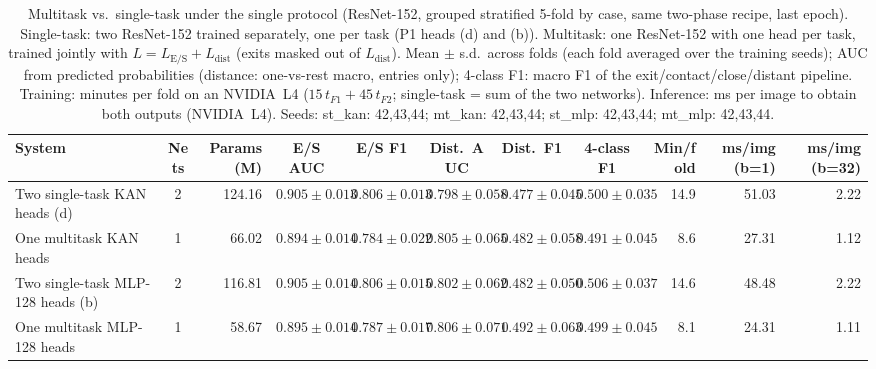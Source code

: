 \begin{table}[t]
\centering
\caption{Multitask vs.\ single-task under the single protocol (ResNet-152, grouped stratified 5-fold by case, same two-phase recipe, last epoch). Single-task: two ResNet-152 trained separately, one per task (P1 heads (d) and (b)). Multitask: one ResNet-152 with one head per task, trained jointly with $L = L_{\mathrm{E/S}} + L_{\mathrm{dist}}$ (exits masked out of $L_{\mathrm{dist}}$). Mean $\pm$ s.d.\ across folds (each fold averaged over the training seeds); AUC from predicted probabilities (distance: one-vs-rest macro, entries only); 4-class F1: macro F1 of the exit/contact/close/distant pipeline. Training: minutes per fold on an NVIDIA~L4 ($15\,t_{F1}+45\,t_{F2}$; single-task = sum of the two networks). Inference: ms per image to obtain both outputs (NVIDIA~L4). Seeds: st\_kan: 42,43,44; mt\_kan: 42,43,44; st\_mlp: 42,43,44; mt\_mlp: 42,43,44.}
\label{tab:multitarefa}
\scriptsize
\setlength{\tabcolsep}{3pt}
\begin{tabular}{lcrcccccrrr}
\hline
System & Nets & Params (M) & E/S AUC & E/S F1 & Dist.\ AUC & Dist.\ F1 & 4-class F1 & Min/fold & ms/img (b=1) & ms/img (b=32) \\
\hline
Two single-task KAN heads (d) & 2 & 124.16 & $0.905 \pm 0.013$ & $0.806 \pm 0.013$ & $0.798 \pm 0.058$ & $0.477 \pm 0.045$ & $0.500 \pm 0.035$ & 14.9 & 51.03 & 2.22 \\
One multitask KAN heads & 1 & 66.02 & $0.894 \pm 0.014$ & $0.784 \pm 0.022$ & $0.805 \pm 0.065$ & $0.482 \pm 0.058$ & $0.491 \pm 0.045$ & 8.6 & 27.31 & 1.12 \\
Two single-task MLP-128 heads (b) & 2 & 116.81 & $0.905 \pm 0.014$ & $0.806 \pm 0.015$ & $0.802 \pm 0.062$ & $0.482 \pm 0.050$ & $0.506 \pm 0.037$ & 14.6 & 48.48 & 2.22 \\
One multitask MLP-128 heads & 1 & 58.67 & $0.895 \pm 0.014$ & $0.787 \pm 0.017$ & $0.806 \pm 0.071$ & $0.492 \pm 0.063$ & $0.499 \pm 0.045$ & 8.1 & 24.31 & 1.11 \\
\hline
\end{tabular}
\end{table}
